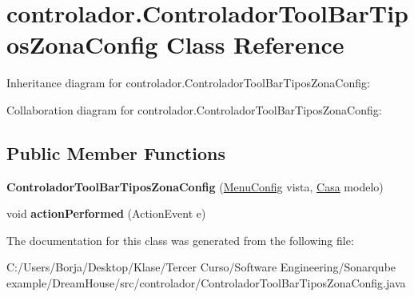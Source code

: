 \hypertarget{classcontrolador_1_1_controlador_tool_bar_tipos_zona_config}{}\section{controlador.\+Controlador\+Tool\+Bar\+Tipos\+Zona\+Config Class Reference}
\label{classcontrolador_1_1_controlador_tool_bar_tipos_zona_config}


Inheritance diagram for controlador.\+Controlador\+Tool\+Bar\+Tipos\+Zona\+Config\+:


Collaboration diagram for controlador.\+Controlador\+Tool\+Bar\+Tipos\+Zona\+Config\+:
\subsection*{Public Member Functions}
\begin{DoxyCompactItemize}
\item 
\mbox{\label{classcontrolador_1_1_controlador_tool_bar_tipos_zona_config_abe5f20494136e5255907b56cc2b84fe1}} 
{\bfseries Controlador\+Tool\+Bar\+Tipos\+Zona\+Config} (\mbox{\hyperlink{classvista_1_1_menu_config}{Menu\+Config}} vista, \mbox{\hyperlink{classmodelo_1_1_casa}{Casa}} modelo)
\item 
\mbox{\label{classcontrolador_1_1_controlador_tool_bar_tipos_zona_config_a4a1a33dc6048a80803fea31e42b77068}} 
void {\bfseries action\+Performed} (Action\+Event e)
\end{DoxyCompactItemize}


The documentation for this class was generated from the following file\+:\begin{DoxyCompactItemize}
\item 
C\+:/\+Users/\+Borja/\+Desktop/\+Klase/\+Tercer Curso/\+Software Engineering/\+Sonarqube example/\+Dream\+House/src/controlador/Controlador\+Tool\+Bar\+Tipos\+Zona\+Config.\+java\end{DoxyCompactItemize}
